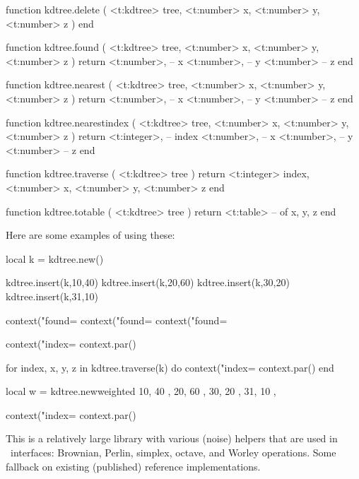 function kdtree.delete (
    <t:kdtree> tree,
    <t:number> x,
    <t:number> y,
    <t:number> z
)
end

function kdtree.found (
    <t:kdtree> tree,
    <t:number> x,
    <t:number> y,
    <t:number> z
)
    return
        <t:number>, -- x
        <t:number>, -- y
        <t:number>  -- z
end

function kdtree.nearest (
    <t:kdtree> tree,
    <t:number> x,
    <t:number> y,
    <t:number> z
)
    return
        <t:number>, -- x
        <t:number>, -- y
        <t:number>  -- z
end

function kdtree.nearestindex (
    <t:kdtree> tree,
    <t:number> x,
    <t:number> y,
    <t:number> z
)
    return
        <t:integer>, -- index
        <t:number>,  -- x
        <t:number>,  -- y
        <t:number>   -- z
end

function kdtree.traverse (
    <t:kdtree> tree
)
    return
        <t:integer> index,
        <t:number>  x,
        <t:number>  y,
        <t:number>  z
end

function kdtree.totable (
    <t:kdtree> tree
)
    return <t:table> -- of { x, y, z }
end
\stoptyping

Here are some examples of using these:

\startbuffer
\startluacode
local k = kdtree.new()

kdtree.insert(k,10,40) kdtree.insert(k,20,60)
kdtree.insert(k,30,20) kdtree.insert(k,31,10)

context("found=%
context("found=%
context("found=%

context("index=%
context.par()

for index, x, y, z in kdtree.traverse(k) do
    context("index=%
    context.par()
end

local w = kdtree.newweighted {
    { 10, 40 },
    { 20, 60 },
    { 30, 20 },
    { 31, 10 },
}

context("index=%
context.par()
\stopluacode
\stopbuffer

\typebuffer[option=TEX]

\startlines \tttf
\getbuffer
\stoplines

\stopsection

\startsubsection[title=Effects]

This is a relatively large library with various (noise) helpers that are used in
\LUAMETAFUN\ interfaces: Brownian, Perlin, simplex, octave, and Worley
operations. Some fallback on existing (published) reference implementations.

